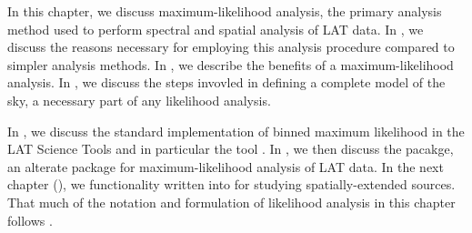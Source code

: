 In this chapter, we discuss maximum-likelihood analysis, the primary
analysis method used to perform spectral and spatial analysis of
\ac{LAT} data.  In , we discuss the
reasons necessary for employing this analysis procedure compared to 
simpler analysis methods.  In ,
we describe the benefits of a maximum-likelihood analysis.
In , we discuss the steps invovled in defining
a complete model of the sky, a necessary part of any likelihood analysis.

In , we discuss the standard implementation
of binned maximum likelihood in the \ac{LAT} Science Tools and
in particular the tool \gtlike.  In ,
we then discuss the \pointlike pacakge, an alterate package for
maximum-likelihood analysis of \ac{LAT} data.  In the next chapter
(), we functionality written into \pointlike
for studying spatially-extended sources.  That much of the notation
and formulation of likelihood analysis in this chapter follows
\cite{kerr_2010a_likelihood-methods}.
